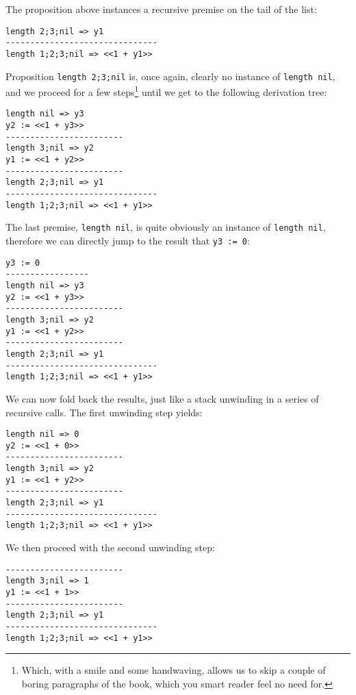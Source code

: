 The proposition above instances a recursive premise on the tail of the list:

\begin{lstlisting}
length 2;3;nil => y1
-------------------------------
length 1;2;3;nil => <<1 + y1>>
\end{lstlisting}

Proposition \texttt{length 2;3;nil} is, once again, clearly no instance of \texttt{length nil}, and we proceed for a few steps\footnote{Which, with a smile and some handwaving, allows us to skip a couple of boring paragraphs of the book, which you smart reader feel no need for.} until we get to the following derivation tree:

\begin{lstlisting}
length nil => y3
y2 := <<1 + y3>>
------------------------
length 3;nil => y2
y1 := <<1 + y2>>
------------------------
length 2;3;nil => y1
-------------------------------
length 1;2;3;nil => <<1 + y1>>
\end{lstlisting}

The last premise, \texttt{length nil}, is quite obviously an instance of \texttt{length nil}, therefore we can directly jump to the result that \texttt{y3 := 0}:

\begin{lstlisting}
y3 := 0
-----------------
length nil => y3
y2 := <<1 + y3>>
------------------------
length 3;nil => y2
y1 := <<1 + y2>>
------------------------
length 2;3;nil => y1
-------------------------------
length 1;2;3;nil => <<1 + y1>>
\end{lstlisting}

We can now fold back the results, just like a stack unwinding in a series of recursive calls. The first unwinding step yields:

\begin{lstlisting}
length nil => 0
y2 := <<1 + 0>>
------------------------
length 3;nil => y2
y1 := <<1 + y2>>
------------------------
length 2;3;nil => y1
-------------------------------
length 1;2;3;nil => <<1 + y1>>
\end{lstlisting}

We then proceed with the second unwinding step:

\begin{lstlisting}
------------------------
length 3;nil => 1
y1 := <<1 + 1>>
------------------------
length 2;3;nil => y1
-------------------------------
length 1;2;3;nil => <<1 + y1>>
\end{lstlisting}

